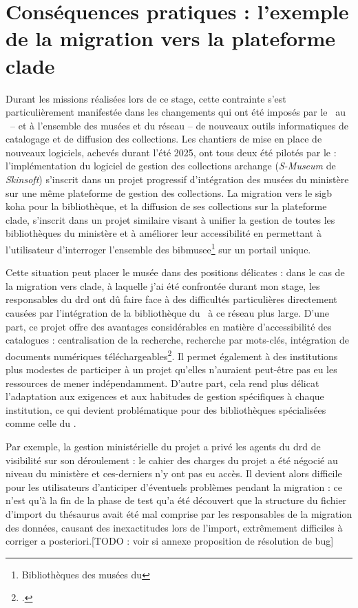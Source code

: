 \section{\label{I-B-2}Conséquences pratiques : l'exemple de la migration vers la plateforme \acs{clade}}

Durant les missions réalisées lors de ce stage, cette contrainte s'est particulièrement manifestée dans les changements qui ont été imposés par le \minarm~au \mae~-- et à l'ensemble des musées et \bibmusee du réseau -- de nouveaux outils informatiques de catalogage et de diffusion des collections. Les chantiers de mise en place de nouveaux logiciels, achevés durant l'été 2025, ont tous deux été pilotés par le \minarm : l'implémentation du logiciel de gestion des collections \gls{archange} (\textit{S-Museum} de \textit{Skinsoft}) s'inscrit dans un projet progressif d'intégration des musées du ministère sur une même plateforme de gestion des collections. La migration vers le \ac{sigb} \gls{koha} pour la bibliothèque, et la diffusion de ses collections sur la plateforme \gls{clade}, s'inscrit dans un projet similaire visant à unifier la gestion de toutes les bibliothèques du ministère et à améliorer leur accessibilité en permettant à l'utilisateur d'interroger l'ensemble des \gls{bibmusee}\footnote{Bibliothèques des musées du \minarm} sur un portail unique.

Cette situation peut placer le musée dans des positions délicates : dans le cas de la migration vers \gls{clade}, à laquelle j'ai été confrontée durant mon stage, les responsables du \ac{drd} ont dû faire face à des difficultés particulières directement causées par l'intégration de la bibliothèque du \mae~à ce réseau plus large. D'une part, ce projet offre des avantages considérables en matière d'accessibilité des catalogues : centralisation de la recherche, recherche par mots-clés, intégration de documents numériques téléchargeables\footcite{ministeredesarmeesKitCommunicationCLADE}. Il permet également à des institutions plus modestes de participer à un projet qu'elles n'auraient peut-être pas eu les ressources de mener indépendamment. D'autre part, cela rend plus délicat l'adaptation aux exigences et aux habitudes de gestion spécifiques à chaque institution, ce qui devient problématique pour des bibliothèques spécialisées comme celle du \mae.

Par exemple, la gestion ministérielle du projet a privé les agents du \ac{drd} de visibilité sur son déroulement : le cahier des charges du projet a été négocié au niveau du ministère et ces-derniers n'y ont pas eu accès. Il devient alors difficile pour les utilisateurs d'anticiper d'éventuels problèmes pendant la migration : ce n'est qu'à la fin de la phase de test qu'a été découvert que la structure du fichier d'import du thésaurus avait été mal comprise par les responsables de la migration des données, causant des inexactitudes lors de l'import, extrêmement difficiles à corriger a posteriori.[TODO : voir si annexe proposition de résolution de bug]

